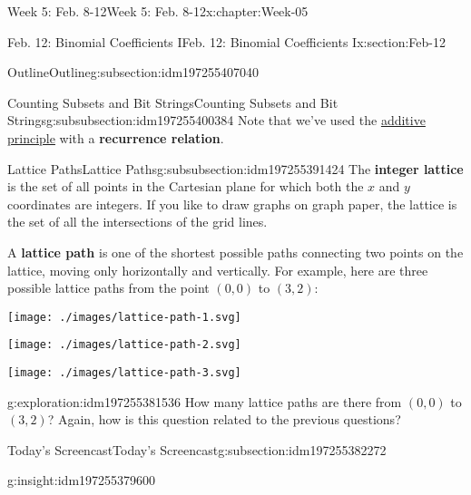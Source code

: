 \documentclass[oneside,10pt,]{book}
\newcommand{\terminology}[1]{\textbf{#1}}
\numberwithin{equation}{section}
\begin{document}
\begin{chapterptx}{Week 5: Feb. 8-12}{}{Week 5: Feb. 8-12}{}{}{x:chapter:Week-05}
\begin{sectionptx}{Feb. 12: Binomial Coefficients I}{}{Feb. 12: Binomial Coefficients I}{}{}{x:section:Feb-12}
\begin{subsectionptx}{Outline}{}{Outline}{}{}{g:subsection:idm197255407040}
\begin{subsubsectionptx}{Counting Subsets and Bit Strings}{}{Counting Subsets and Bit Strings}{}{}{g:subsubsection:idm197255400384}
Note that we've used the \hyperref[x:assemblage:additive-principle]{additive principle} with a \terminology{recurrence relation}.%
\end{subsubsectionptx}
%
%
\typeout{************************************************}
\typeout{************************************************}
%
\begin{subsubsectionptx}{Lattice Paths}{}{Lattice Paths}{}{}{g:subsubsection:idm197255391424}
 The \terminology{integer lattice} is the set of all points in the Cartesian plane for which both the \(x\) and \(y\) coordinates are integers. If you like to draw graphs on graph paper, the lattice is the set of all the intersections of the grid lines.%
\par
A \terminology{lattice path}  is one of the shortest possible paths connecting two points on the lattice, moving only horizontally and vertically. For example, here are three possible lattice paths from the point \((0,0)\) to \((3,2)\):%
\begin{sidebyside}{3}{0.0166666666666667}{0.0166666666666667}{0.0333333333333333}%
\begin{sbspanel}{0.3}%
\texttt{[image: ./images/lattice-path-1.svg]}
\end{sbspanel}%
\begin{sbspanel}{0.3}%
\texttt{[image: ./images/lattice-path-2.svg]}
\end{sbspanel}%
\begin{sbspanel}{0.3}%
\texttt{[image: ./images/lattice-path-3.svg]}
\end{sbspanel}%
\end{sidebyside}%
\begin{exploration}{}{g:exploration:idm197255381536}%
How many lattice paths are there from \((0,0)\) to \((3,2)\)? Again, how is this question related to the previous questions?%
\end{exploration}%
\end{subsubsectionptx}
\end{subsectionptx}
%
%
\typeout{************************************************}
\typeout{************************************************}
%
\begin{subsectionptx}{Today's Screencast}{}{Today's Screencast}{}{}{g:subsection:idm197255382272}
\begin{insight}{}{g:insight:idm197255379600}%

\end{insight}
\end{subsectionptx}
\end{sectionptx}
\end{chapterptx}
\end{document}
